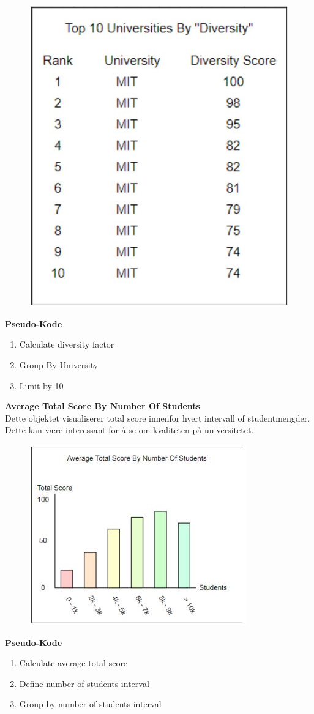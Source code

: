 \FigureCounter
\begin{figure}[H]
  \includegraphics[scale=1]{images/milepael4/topTenUnis.JPG}
\end{figure}

\textbf{Pseudo-Kode}
\begin{enumerate}
  \item Calculate diversity factor
  \item Group By University
  \item Limit by 10
\end{enumerate}
\pagebreak
\textbf{Average Total Score By Number Of Students}\\
Dette objektet visualiserer total score innenfor hvert intervall of studentmengder. Dette kan være 
interessant for å se om kvaliteten på universitetet.

\FigureCounter
\begin{figure}[H]
  \includegraphics[scale=1]{images/milepael4/averageScoreByStudents.JPG}
\end{figure}

\textbf{Pseudo-Kode}
\begin{enumerate}
  \item Calculate average total score
  \item Define number of students interval
  \item Group by number of students interval
\end{enumerate}